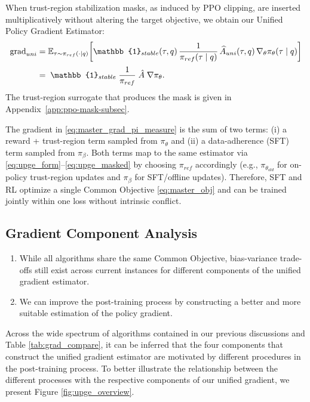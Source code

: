 When trust-region stabilization masks, as induced by PPO clipping, are inserted multiplicatively without altering the target objective, we obtain our Unified Policy Gradient Estimator:
\begin{equation}
\label{eq:upge_masked}
\begin{aligned}
\mathrm{grad}_{uni}
&=
\E_{\tau\sim \pi_{ref}(\cdot\mid q)}\!\left[
\mathbb{1}_{stable}(\tau,q)\,
\frac{1}{\pi_{ref}(\tau\mid q)}\,
\widehat{A}_{uni}(\tau,q)\,
\nabla_\theta \pi_\theta(\tau\mid q)
\right]
\\[2pt]
&=\;
\mathbb{1}_{stable}\;
\frac{1}{\pi_{ref}}\;
\hat{A}\;
\nabla \pi_\theta.
\end{aligned}
\end{equation}
The trust-region surrogate that produces the mask is given in Appendix~\ref{app:ppo-mask-subsec}.


The gradient in \eqref{eq:master_grad_pi_measure} is the sum of two terms: (i) a reward + trust-region term sampled from $\pi_\theta$ and (ii) a data-adherence (SFT) term sampled from $\pi_\beta$. Both terms map to the same estimator via \eqref{eq:upge_form}–\eqref{eq:upge_masked} by choosing $\pi_{ref}$ accordingly (e.g., $\pi_{\theta_{old}}$ for on-policy trust-region updates and $\pi_\beta$ for SFT/offline updates). Therefore, SFT and RL optimize a single Common Objective \eqref{eq:master_obj} and can be trained jointly within one loss without intrinsic conflict.



\subsection{Gradient Component Analysis} \label{sec:component-analysis}

\begin{tcolorbox}[takeawaysbox]
\begin{enumerate}[leftmargin=1em]
    \item While all algorithms share the same Common Objective, bias-variance trade-offs still exist across current instances for different components of the unified gradient estimator.
    \item We can improve the post-training process by constructing a better and more suitable estimation of the policy gradient.
\end{enumerate}


\end{tcolorbox}


Across the wide spectrum of algorithms contained in our previous discussions and Table \ref{tab:grad_compare}, it can be inferred that the four components that construct the unified gradient estimator are motivated by different procedures in the post-training process. 
To better illustrate the relationship between the different processes with the respective components of our unified gradient, we present Figure \ref{fig:upge_overview}.



